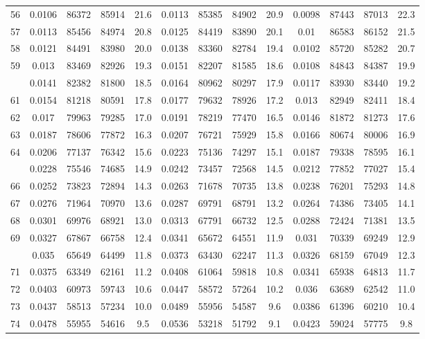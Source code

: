 \documentclass[
  14pt,
]{article}
\begin{document}
\begin{longtable}[t]{lcccccccccccc}
56 & 0.0106 & 86372 & 85914 & 21.6 & 0.0113 & 85385 & 84902 & 20.9 & 0.0098 & 87443 & 87013 & 22.3\\
57 & 0.0113 & 85456 & 84974 & 20.8 & 0.0125 & 84419 & 83890 & 20.1 & 0.01 & 86583 & 86152 & 21.5\\
58 & 0.0121 & 84491 & 83980 & 20.0 & 0.0138 & 83360 & 82784 & 19.4 & 0.0102 & 85720 & 85282 & 20.7\\
59 & 0.013 & 83469 & 82926 & 19.3 & 0.0151 & 82207 & 81585 & 18.6 & 0.0108 & 84843 & 84387 & 19.9\\
\addlinespace
60 & 0.0141 & 82382 & 81800 & 18.5 & 0.0164 & 80962 & 80297 & 17.9 & 0.0117 & 83930 & 83440 & 19.2\\
61 & 0.0154 & 81218 & 80591 & 17.8 & 0.0177 & 79632 & 78926 & 17.2 & 0.013 & 82949 & 82411 & 18.4\\
62 & 0.017 & 79963 & 79285 & 17.0 & 0.0191 & 78219 & 77470 & 16.5 & 0.0146 & 81872 & 81273 & 17.6\\
63 & 0.0187 & 78606 & 77872 & 16.3 & 0.0207 & 76721 & 75929 & 15.8 & 0.0166 & 80674 & 80006 & 16.9\\
64 & 0.0206 & 77137 & 76342 & 15.6 & 0.0223 & 75136 & 74297 & 15.1 & 0.0187 & 79338 & 78595 & 16.1\\
\addlinespace
65 & 0.0228 & 75546 & 74685 & 14.9 & 0.0242 & 73457 & 72568 & 14.5 & 0.0212 & 77852 & 77027 & 15.4\\
66 & 0.0252 & 73823 & 72894 & 14.3 & 0.0263 & 71678 & 70735 & 13.8 & 0.0238 & 76201 & 75293 & 14.8\\
67 & 0.0276 & 71964 & 70970 & 13.6 & 0.0287 & 69791 & 68791 & 13.2 & 0.0264 & 74386 & 73405 & 14.1\\
68 & 0.0301 & 69976 & 68921 & 13.0 & 0.0313 & 67791 & 66732 & 12.5 & 0.0288 & 72424 & 71381 & 13.5\\
69 & 0.0327 & 67867 & 66758 & 12.4 & 0.0341 & 65672 & 64551 & 11.9 & 0.031 & 70339 & 69249 & 12.9\\
\addlinespace
70 & 0.035 & 65649 & 64499 & 11.8 & 0.0373 & 63430 & 62247 & 11.3 & 0.0326 & 68159 & 67049 & 12.3\\
71 & 0.0375 & 63349 & 62161 & 11.2 & 0.0408 & 61064 & 59818 & 10.8 & 0.0341 & 65938 & 64813 & 11.7\\
72 & 0.0403 & 60973 & 59743 & 10.6 & 0.0447 & 58572 & 57264 & 10.2 & 0.036 & 63689 & 62542 & 11.0\\
73 & 0.0437 & 58513 & 57234 & 10.0 & 0.0489 & 55956 & 54587 & 9.6 & 0.0386 & 61396 & 60210 & 10.4\\
74 & 0.0478 & 55955 & 54616 & 9.5 & 0.0536 & 53218 & 51792 & 9.1 & 0.0423 & 59024 & 57775 & 9.8\\

\end{longtable}
\end{document}
